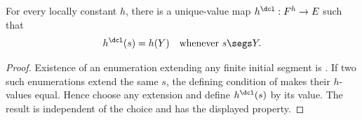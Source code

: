 \begin{lemma}
For every locally constant $h$, there is a unique-value map
$h^{\dcl}:F^h\to E$ such that
\[
h^{\dcl}(s)=h(Y)\quad\text{whenever }s\segs Y.
\]
\end{lemma}
\begin{proof}
Existence of an enumeration extending any finite initial segment is
.  If two such enumerations extend the same $s$, the defining
condition of  makes their $h$-values equal.  Hence
choose any extension and define $h^{\dcl}(s)$ by its value.  The result is
independent of the choice and has the displayed property.
\end{proof}
